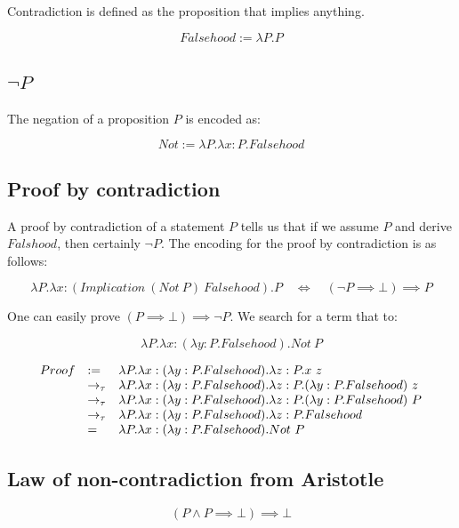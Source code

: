 Contradiction is defined as the proposition that implies anything.

\[
    Falsehood := \lambda P.P
\]

\subsection{$\neg P$}

The negation of a proposition $P$ is encoded as:

\[
    Not := \lambda P.\lambda x:P.Falsehood
\]

\subsection{Proof by contradiction}

A proof by contradiction of a statement $P$ tells us that if we assume $P$ and derive $Falshood$, then certainly $\neg P$. The encoding for the proof by contradiction is as follows:

\[
    \lambda P.\lambda x:(Implication\ (Not\ P)\ Falsehood).P \quad\Longleftrightarrow\quad (\neg P \implies \bot) \implies P
\]

One can easily prove $(P \implies \bot) \implies \neg P$. We search for a term that \taureduces to:

\[
    \lambda P.\lambda x:(\lambda y:P.Falsehood).Not\ P
\]

\[
\begin{array}{lll}
    Proof   & :=      & \lambda P.\lambda x:(\lambda y:P.Falsehood).\lambda z:P.x\ z \\
            & \to_\tau  & \lambda P.\lambda x:(\lambda y:P.Falsehood).\lambda z:P.(\lambda y:P.Falsehood)\ z \\
            & \to_\tau  & \lambda P.\lambda x:(\lambda y:P.Falsehood).\lambda z:P.(\lambda y:P.Falsehood)\ P \\
            & \to_\tau  & \lambda P.\lambda x:(\lambda y:P.Falsehood).\lambda z:P.Falsehood \\
            & =       & \lambda P.\lambda x:(\lambda y:P.Falsehood).Not\ P
\end{array}
\]

\subsection{Law of non-contradiction from Aristotle}

\[
    (P \land P \implies \bot) \implies  \bot
\]

